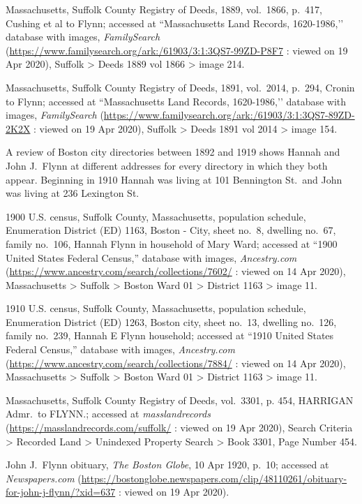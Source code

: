 \begin{thebibliography}{999}
Massachusetts, Suffolk County Registry of Deeds, 1889, vol.\ 1866, p.\ 417, Cushing et al to Flynn; accessed at ``Massachusetts Land Records, 1620-1986,’’ database with images, \textit{FamilySearch} (\url{https://www.familysearch.org/ark:/61903/3:1:3QS7-99ZD-P8F7} : viewed on 19 Apr 2020), Suffolk > Deeds 1889 vol 1866 > image 214.

Massachusetts, Suffolk County Registry of Deeds, 1891, vol.\ 2014, p.\ 294, Cronin to Flynn; accessed at ``Massachusetts Land Records, 1620-1986,’’ database with images, \textit{FamilySearch} (\url{https://www.familysearch.org/ark:/61903/3:1:3QS7-89ZD-2K2X} : viewed on 19 Apr 2020), Suffolk > Deeds 1891 vol 2014 > image 154.

A review of Boston city directories between 1892 and 1919 shows Hannah and John J.\ Flynn at different addresses for every directory in which they both appear. Beginning in 1910 Hannah was living at 101 Bennington St.\ and John was living at 236 Lexington St.

1900 U.S. census, Suffolk County, Massachusetts, population schedule, Enumeration District (ED) 1163, Boston - City, sheet no.\ 8, dwelling no.\ 67, family no.\ 106, Hannah Flynn in household of Mary Ward; accessed at ``1900 United States Federal Census,'' database with images, \textit{Ancestry.com} (\url{https://www.ancestry.com/search/collections/7602/} : viewed on 14 Apr 2020), Massachusetts > Suffolk > Boston Ward 01 > District 1163 > image 11.

1910 U.S. census, Suffolk County, Massachusetts, population schedule, Enumeration District (ED) 1263, Boston city, sheet no.\ 13, dwelling no.\ 126, family no.\ 239, Hannah E Flynn household; accessed at ``1910 United States Federal Census,'' database with images, \textit{Ancestry.com} (\url{https://www.ancestry.com/search/collections/7884/} : viewed on 14 Apr 2020), Massachusetts > Suffolk > Boston Ward 01 > District 1163 > image 11.

Massachusetts, Suffolk County Registry of Deeds, vol.\ 3301, p. 454, HARRIGAN Admr.\ to FLYNN.; accessed at \textit{masslandrecords} (\url{https://masslandrecords.com/suffolk/} : viewed on 19 Apr 2020), Search Criteria > Recorded Land > Unindexed Property Search >  Book 3301, Page Number 454.

John J.\ Flynn obituary, \textit{The Boston Globe}, 10 Apr 1920, p.\ 10; accessed at \textit{Newspapers.com} (\url{https://bostonglobe.newspapers.com/clip/48110261/obituary-for-john-j-flynn/?xid=637} : viewed on 19 Apr 2020).


\end{thebibliography}
